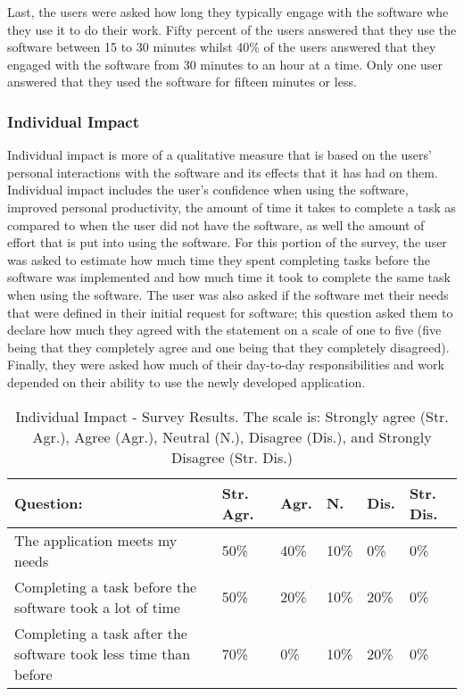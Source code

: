 Last, the users were asked how long they typically engage with the software whe they use it to do their work. Fifty percent of the users answered that they use the software between 15 to 30 minutes whilst 40\% of the users answered that they engaged with the software from 30 minutes to an hour at a time. Only one user answered that they used the software for fifteen minutes or less.


\subsubsection{Individual Impact}
Individual impact is more of a qualitative measure that is based on the users' personal interactions with the software and its effects that it has had on them. Individual impact includes the user's confidence when using the software, improved personal productivity, the amount of time it takes to complete a task as compared to when the user did not have the software, as well the amount of effort that is put into using the software. For this portion of the survey, the user was asked to estimate how much time they spent completing tasks before the software was implemented and how much time it took to complete the same task when using the software. The user was also asked if the software met their needs that were defined in their initial request for software; this question asked them to declare how much they agreed with the statement on a scale of one to five (five being that they completely agree and one being that they  completely disagreed). Finally, they were asked how much of their day-to-day responsibilities and work depended on their ability to use the newly developed application.


\begin{table}
\caption{Individual Impact - Survey Results. The scale is: Strongly agree (Str. Agr.), Agree (Agr.), Neutral (N.), Disagree (Dis.), and Strongly Disagree (Str. Dis.)}
\label{table:usersatisfaction}
\begin{tabular}{p{2.6cm}p{.75cm}p{.75cm}p{.75cm}p{.75cm}p{.75cm}}
Question: & Str. Agr. & Agr. & N. & Dis. & Str. Dis. \\
 \hline
The application meets my needs & 50\% & 40\% & 10\% & 0\% & 0\% \\
Completing a task before the software took a lot of time & 50\% & 20\% & 10\% & 20\% & 0\% \\
Completing a task after the software took less time than before & 70\% & 0\% & 10\% & 20\% & 0\% \\
\end{tabular}
\end{table}


